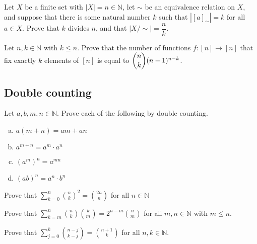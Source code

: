 \begin{chapex}
Let $X$ be a finite set with $|X| = n \in \mathbb{N}$, let $\sim$ be an equivalence relation on $X$, and suppose that there is some natural number $k$ such that $|[a]_{\sim}| = k$ for all $a \in X$. Prove that $k$ divides $n$, and that $|X/{\sim}| = \dfrac{n}{k}$.
\end{chapex}

\begin{chapex}
Let $n,k \in \mathbb{N}$ with $k \le n$. Prove that the number of functions $f : [n] \to [n]$ that fix exactly $k$ elements of $[n]$ is equal to $\dbinom{n}{k}(n-1)^{n-k}$.
\end{chapex}

\subsection*{Double counting}

\begin{chapex}
Let $a,b,m,n \in \mathbb{N}$. Prove each of the following by double counting.
\begin{multicols}{2}
\begin{enumerate}[(a)]
\item $a(m+n) = am + an$
\item $a^{m+n} = a^m \cdot a^n$
\item $(a^m)^n = a^{mn}$
\item $(ab)^n = a^n \cdot b^n$
\end{enumerate}
\end{multicols}
\end{chapex}

\begin{chapex}
Prove that $\displaystyle \sum_{k=0}^n \binom{n}{k}^2 = \binom{2n}{n}$ for all $n \in \mathbb{N}$
\end{chapex}

\begin{chapex}
Prove that $\displaystyle \sum_{k=m}^n \binom{n}{k} \binom{k}{m} = 2^{n-m} \binom{n}{m}$ for all $m,n \in \mathbb{N}$ with $m \le n$.
\end{chapex}

\begin{chapex}
Prove that $\displaystyle \sum_{j=0}^k \binom{n-j}{k-j} = \binom{n+1}{k}$ for all $n,k \in \mathbb{N}$.
\end{chapex}

